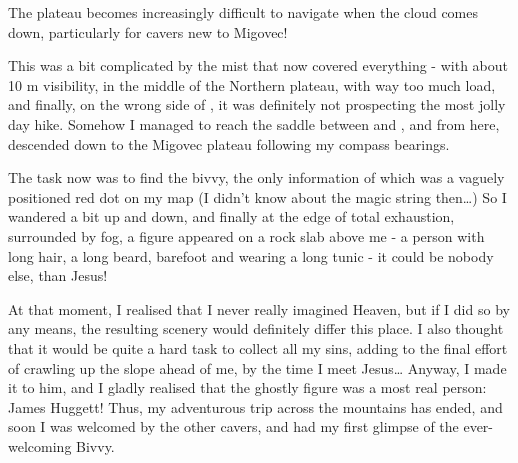 \begin{marginfigure}
\checkoddpage \ifoddpage \forcerectofloat \else \forceversofloat \fi
\centering
 \caption{The plateau becomes increasingly difficult to navigate when the cloud comes down, particularly for cavers new to Migovec! }
 \label{plateau cloud gergely}
\end{marginfigure}



This was a bit complicated by the mist that now covered everything -
with about 10 m visibility, in the middle of the Northern plateau, with
way too much load, and finally, on the wrong side of , it was
definitely not prospecting the most jolly day hike. Somehow I managed to
reach the saddle between  and , and from here, descended down
to the Migovec plateau following my compass bearings.

The task now was to find the bivvy, the only information of which was a
vaguely positioned red dot on my map (I didn't know about the magic
string then\ldots{}) So I wandered a bit up and down, and finally at the
edge of total exhaustion, surrounded by fog, a figure appeared on a rock
slab above me - a person with long hair, a long beard, barefoot and
wearing a long tunic - it could be nobody else, than Jesus!

At that moment, I realised that I never really imagined Heaven, but if I
did so by any means, the resulting scenery would definitely differ this
place. I also thought that it would be quite a hard task to collect all
my sins, adding to the final effort of crawling up the slope ahead of
me, by the time I meet Jesus\ldots{} Anyway, I made it to him, and I
gladly realised that the ghostly figure was a most real person: James
Huggett! Thus, my adventurous trip across the mountains has ended, and
soon I was welcomed by the other cavers, and had my first glimpse of the
ever-welcoming Bivvy.


